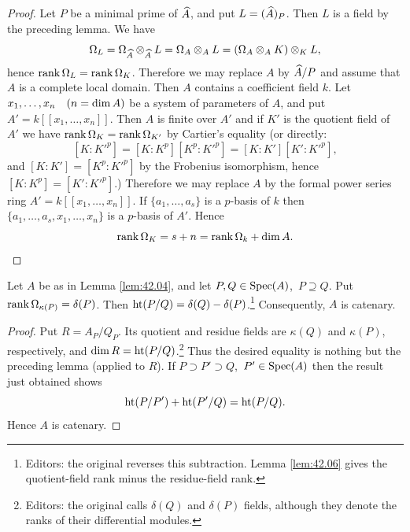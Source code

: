 \documentclass[../main]{subfiles}
\begin{document}
\begin{proof}
Let $P$ be a minimal prime of $\widehat{A}$, and put $L=(\widehat{A})_P$. Then $L$ is a field by the preceding lemma. We have \[\Omega_L=\Omega_{\widehat{A}} \otimes_{\widehat{A}} L=\Omega_A \otimes_A L=(\Omega_A \otimes_A K) \otimes_K L,\] hence $\operatorname{rank} \Omega_L=\operatorname{rank} \Omega_K$. Therefore we may replace $A$ by $\widehat{A} / P$ and assume that $A$ is a complete local domain. Then $A$ contains a coefficient field $k$. Let $x_1, \ldots, x_n\for{n=\dim A}$ be a system of parameters of $A$, and put $A'=k[[x_1, \ldots, x_n]]$. Then $A$ is finite over $A'$ and if $K'$ is the quotient field of $A'$ we have \newline $\operatorname{rank}\Omega_K=\operatorname{rank}\Omega_{K'}$ by Cartier's equality (or directly:
\[[K: K'^p]=[K: K^p][K^p: K'^p]=[K: K'][K': K'^p],\] and $[K: K']=[K^p: K'^p]$ by the Frobenius isomorphism, hence \newline $[K: K^p]=[K': K'^p]$.) Therefore we may replace $A$ by the formal power series ring $A'=k[[x_1, \ldots, x_n]]$. If $\{a_1, \ldots, a_s\}$ is a $p$-basis of $k$ then $\{a_1, \ldots, a_s, x_1, \ldots, x_n\}$ is a $p$-basis of $A'$. Hence \[\operatorname{rank} \Omega_K=s+n=\operatorname{rank} \Omega_k+\operatorname{dim} A.\]
\end{proof}

\begin{lemma}\label{lem:42.07}
Let $A$ be as in Lemma \ref{lem:42.04}, and let $P, Q \in \operatorname{Spec}(A)$, $\, P \supseteq Q$. Put $\operatorname{rank}\Omega_{\kappa(P)}=\delta(P)$. Then $\operatorname{ht}(P / Q)=\delta(Q)-\delta(P)$.\footnote{Editors: the original reverses this subtraction. Lemma \ref{lem:42.06} gives the quotient-field rank minus the residue-field rank.} Consequently, $A$ is catenary.
\end{lemma}

\begin{proof}
Put $R=A_P / Q_P$. Its quotient and residue fields are $\kappa(Q)$ and $\kappa(P)$, respectively, and $\operatorname{dim} R=\operatorname{ht}(P / Q)$.\footnote{Editors: the original calls $\delta(Q)$ and $\delta(P)$ fields, although they denote the ranks of their differential modules.} Thus the desired equality is nothing but the preceding lemma (applied to $R$). If $P \supset P' \supset Q$, $\, P' \in \operatorname{Spec}(A)$ then the result just obtained shows \[\operatorname{ht}(P / P')+\operatorname{ht}(P' / Q)=\operatorname{ht} (P / Q).\] Hence $A$ is catenary.
\end{proof}
\end{document}
